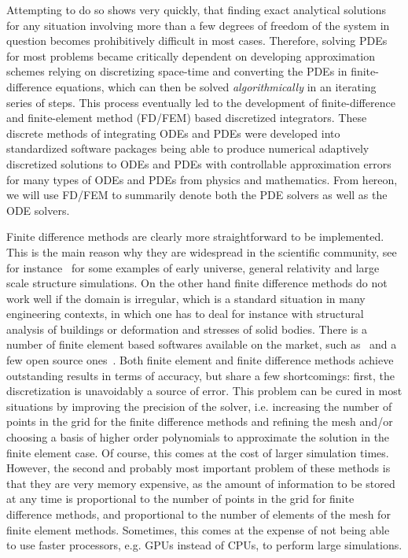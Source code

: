 \documentclass{article}
\begin{document}
Attempting to do so shows very quickly, that finding exact analytical solutions for any situation involving more than a few degrees of freedom of the system in question becomes prohibitively difficult in most cases. Therefore, solving PDEs for most problems became critically dependent on developing approximation schemes relying on discretizing space-time and converting the PDEs in finite-difference equations, which can then be solved \emph{algorithmically} in an iterating series of steps. This process eventually led to the development of finite-difference and finite-element method (FD/FEM) based discretized integrators.
These discrete methods of integrating ODEs and PDEs were developed into standardized software packages being able to produce numerical adaptively discretized solutions to ODEs and PDEs with controllable approximation errors for many types of ODEs and PDEs from physics and mathematics. From hereon, we will use FD/FEM to summarily denote both the PDE solvers as well as the ODE solvers. 

Finite difference methods are clearly more straightforward to be implemented. This is the main reason why they are widespread in the scientific community, see for instance~\cite{Felder_2008, Frolov_2008, Sainio:2009hm, Huang:2011gf, Sainio:2012mw, Child:2013ria, Clough:2015sqa, Mewes_2018, Giblin:2019nuv, Vogelsberger:2019ynw} for some examples of early universe, general relativity and large scale structure simulations. On the other hand finite difference methods do not work well if the domain is irregular, which is a standard situation in many engineering contexts, in which one has to deal for instance with structural analysis of buildings or deformation and stresses of solid bodies. There is a number of finite element based softwares available on the market, such as~\cite{Mathematica, MATLAB:2010, multiphysics1998introduction} and a few open source ones~\cite{maple, bastian2020dune, AlnaesBlechta2015a, mfem}. Both finite element and finite difference methods achieve outstanding results in terms of accuracy, but share a few shortcomings: first, the discretization is unavoidably a source of error. This problem can be cured in most situations by improving the precision of the solver, i.e. increasing the number of points in the grid for the finite difference methods and refining the mesh and/or choosing a basis of higher order polynomials to approximate the solution in the finite element case. Of course, this comes at the cost of larger simulation times. However, the second and probably most important problem of these methods is that they are very memory expensive, as the amount of information to be stored at any time is proportional to the number of points in the grid for finite difference methods, and proportional to the number of elements of the mesh for finite element methods. Sometimes, this comes at the expense of not being able to use faster processors, e.g. GPUs instead of CPUs, to perform large simulations. 
\end{document}
